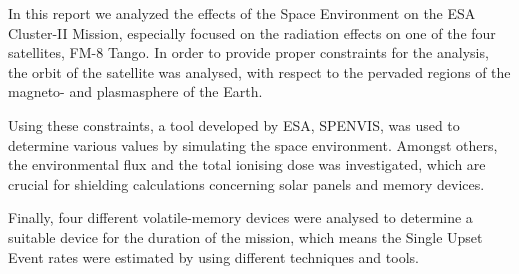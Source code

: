 \clearpage\thispagestyle{empty}\addtocounter{page}{-1} 
\abstract
In this report we analyzed the effects of the Space Environment on the ESA Cluster-II Mission, especially focused on the radiation effects on one of the four satellites, FM-8 Tango.
In order to provide proper constraints for the analysis, the orbit of the satellite was analysed, with respect to the pervaded regions of the magneto- and plasmasphere of the Earth.

Using these constraints, a tool developed by ESA, SPENVIS, was used to determine various values by simulating the space environment.
Amongst others, the environmental flux and the total ionising dose was investigated, which are crucial for shielding calculations concerning solar panels and memory devices.

Finally, four different volatile-memory devices were analysed to determine a suitable device for the duration of the mission, which means the Single Upset Event rates were estimated by using different techniques and tools.


